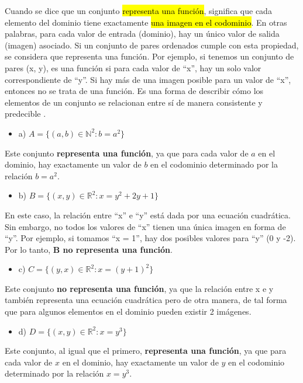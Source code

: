 \documentclass{templateNote}
\begin{document}
\begin{tcolorbox}[colback=orange!10!white,colframe=orange!75!black,title=Observaciones]
    Cuando se dice que un conjunto \hl{representa una función}, significa que cada elemento del dominio tiene exactamente \hl{una imagen en el codominio}. En otras palabras, 
    para cada valor de entrada (dominio), hay un único valor de salida (imagen) asociado. Si un conjunto de pares ordenados cumple con esta propiedad, se considera que
    representa una función. Por ejemplo, si tenemos un conjunto de pares (x, y), es una función si para cada valor de “x”, hay un solo valor correspondiente de “y”. 
    Si hay más de una imagen posible para un valor de “x”, entonces no se trata de una función. Es una forma de describir cómo los elementos de un conjunto se relacionan 
    entre sí de manera consistente y predecible .
\end{tcolorbox}

\begin{itemize}
    \item a) $A = \{(a,b) \in \mathbb{N}^{2} : b = a^{2}\}$
\end{itemize}
Este conjunto \textbf{representa una función}, ya que para cada valor de \(a\) en el dominio, hay exactamente un valor de \(b\) en el codominio determinado por la relación \(b = a^{2}\).

\begin{itemize}
    \item b) $B = \{(x,y) \in \mathbb{R}^{2} : x = y^2 + 2y + 1\}$
\end{itemize}
En este caso, la relación entre “x” e “y” está dada por una ecuación cuadrática. Sin embargo, no todos los valores de “x” tienen una única imagen en forma de “y”. Por ejemplo, si tomamos “x = 1”, hay dos posibles valores para “y” (0 y -2). Por lo tanto, \textbf{B no representa una función}.

\begin{itemize}
    \item c) $C = \{(y,x) \in \mathbb{R}^2 : x = (y + 1)^2\}$
\end{itemize}
Este conjunto \textbf{no representa una función}, ya que la relación entre x e y también representa una ecuación cuadrática pero de otra manera, de tal forma que para algunos elementos en el dominio pueden existir 2 imágenes.

\begin{itemize}
    \item d) $D = \{(x,y) \in \mathbb{R}^2 : x = y^3\}$
\end{itemize}
Este conjunto, al igual que el primero, \textbf{representa una función}, ya que para cada valor de \(x\) en el dominio, hay exactamente un valor de \(y\) en el codominio determinado por la relación \(x = y^{3}\).
\end{document}
